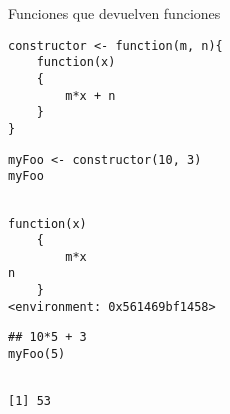 \documentclass[xcolor={usenames,svgnames,dvipsnames}]{beamer}
\begin{document}
\begin{frame}[label={sec:org013a655},fragile]{Funciones que devuelven funciones}
 \lstset{language=r,label= ,caption= ,captionpos=b,numbers=none}
\begin{lstlisting}
constructor <- function(m, n){
    function(x)
    {
        m*x + n
    }
}
\end{lstlisting}

\lstset{language=r,label= ,caption= ,captionpos=b,numbers=none}
\begin{lstlisting}
myFoo <- constructor(10, 3)
myFoo
\end{lstlisting}

\begin{verbatim}

function(x)
    {
        m*x
n
    }
<environment: 0x561469bf1458>
\end{verbatim}


\lstset{language=r,label= ,caption= ,captionpos=b,numbers=none}
\begin{lstlisting}
## 10*5 + 3
myFoo(5)
\end{lstlisting}

\begin{verbatim}

[1] 53
\end{verbatim}
\end{frame}
\end{document}
